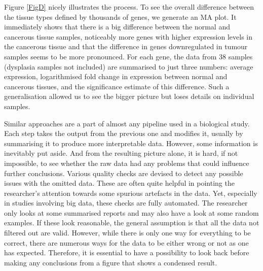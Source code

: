 \documentclass[twocolumn,10pt]{article}
\begin{document}
Figure \ref{FigD} nicely illustrates the process. To see the overall difference between the tissue types defined by thousands of genes, we generate an MA plot. It immediately shows that there is a big difference between the normal and cancerous tissue samples, noticeably more genes with higher expression levels in the cancerous tissue and that the difference in genes downregulated in tumour samples seems to be more pronounced. For each gene, the data from 38 samples (dysplasia samples not included) are summarised to just three numbers: average expression, logarithmised fold change in expression between normal and cancerous tissues, and the significance estimate of this difference. Such a generalisation allowed us to see the bigger picture but loses details on individual samples.

Similar approaches are a part of almost any pipeline used in a biological study. Each step takes the output from the previous one and modifies it, usually by summarising it to produce more interpretable data. However, some information is inevitably put aside. And from the resulting picture alone, it is hard, if not impossible, to see whether the raw data had any problems that could influence further conclusions. Various quality checks are devised to detect any possible issues with the omitted data. These are often quite helpful in pointing the researcher's attention towards some spurious artefacts in the data. Yet, especially in studies involving big data, these checks are fully automated. The researcher only looks at some summarised reports and may also have a look at some random examples. If these look reasonable, the general assumption is that all the data not filtered out are valid. However, while there is only one way for everything to be correct, there are numerous ways for the data to be either wrong or not as one has expected. Therefore, it is essential to have a possibility to look back before making any conclusions from a figure that shows a condensed result.
\end{document}
